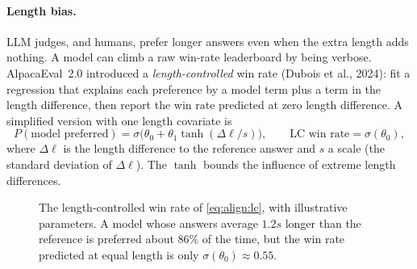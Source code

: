 \paragraph{Length bias.} LLM judges, and humans, prefer longer answers even when the extra length
adds nothing. A model can climb a raw win-rate leaderboard by being verbose. AlpacaEval~2.0
introduced a \emph{length-controlled} win rate (Dubois et al., 2024): fit a regression that
explains each preference by a model term plus a term in the length difference, then report the
win rate predicted at zero length difference. A simplified version with one length covariate is
\begin{equation}
  P(\text{model preferred}) = \sigma\!\big(\theta_0 + \theta_1 \tanh(\Delta\ell/s)\big),
  \qquad \text{LC win rate} = \sigma(\theta_0),
  \label{eq:align:lc}
\end{equation}
where $\Delta\ell$ is the length difference to the reference answer and $s$ a scale (the standard
deviation of $\Delta\ell$). The $\tanh$ bounds the influence of extreme length differences.

\begin{figure}[t]
\centering
{}
\caption{The length-controlled win rate of \cref{eq:align:lc}, with illustrative parameters. A
model whose answers average $1.2s$ longer than the reference is preferred about 86\% of the
time, but the win rate predicted at equal length is only $\sigma(\theta_0)\approx0.55$.}
\label{fig:align:lc}
\end{figure}

